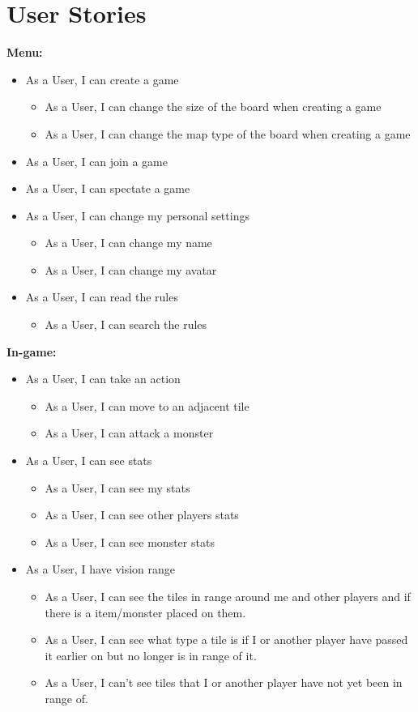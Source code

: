 \section{User Stories}

\textbf{Menu:}
	\begin{itemize}
		\item As a User, I can create a game
		\begin{itemize}
			\item As a User, I can change the size of the board when creating a game
			\item As a User, I can change the map type of the board when creating a game
		\end{itemize}
		\item As a User, I can join a game
		\item As a User, I can spectate a game
		\item As a User, I can change my personal settings
		\begin{itemize}
			\item As a User, I can change my name
			\item As a User, I can change my avatar
		\end{itemize}
		\item As a User, I can read the rules
		\begin{itemize}
			\item As a User, I can search the rules
		\end{itemize}
	\end{itemize}

	\textbf{In-game:}
	\begin{itemize}	
		
		\item As a User, I can take an action
		\begin{itemize}
			\item As a User, I can move to an adjacent tile
			\item As a User, I can attack a monster
		\end{itemize}
		
		\item As a User, I can see stats
		\begin{itemize}
			\item As a User, I can see my stats
			\item As a User, I can see other players stats
			\item As a User, I can see monster stats
		\end{itemize}
		\item As a User, I have vision range
		\begin{itemize}
			\item As a User, I can see the tiles in range around me and other players and if there is a item/monster placed on them.
			\item As a User, I can see what type a tile is if I or another player have passed it earlier on but no longer is in range of it.
			\item As a User, I can't see tiles that I or another player have not yet been in range of.
		\end{itemize}
	\end{itemize}